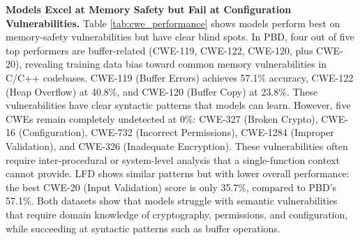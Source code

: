 \documentclass[lettersize,journal]{IEEEtran}
\begin{document}
\textbf{Models Excel at Memory Safety but Fail at Configuration Vulnerabilities.} Table \ref{tab:cwe_performance} shows models perform best on memory-safety vulnerabilities but have clear blind spots. In PBD, four out of five top performers are buffer-related (CWE-119, CWE-122, CWE-120, plus CWE-20), revealing training data bias toward common memory vulnerabilities in C/C++ codebases. CWE-119 (Buffer Errors) achieves 57.1\% accuracy, CWE-122 (Heap Overflow) at 40.8\%, and CWE-120 (Buffer Copy) at 23.8\%. These vulnerabilities have clear syntactic patterns that models can learn. However, five CWEs remain completely undetected at 0\%: CWE-327 (Broken Crypto), CWE-16 (Configuration), CWE-732 (Incorrect Permissions), CWE-1284 (Improper Validation), and CWE-326 (Inadequate Encryption). These vulnerabilities often require inter-procedural or system-level analysis that a single-function context cannot provide. LFD shows similar patterns but with lower overall performance: the best CWE-20 (Input Validation) score is only 35.7\%, compared to PBD's 57.1\%. Both datasets show that models struggle with semantic vulnerabilities that require domain knowledge of cryptography, permissions, and configuration, while succeeding at syntactic patterns such as buffer operations.
\end{document}
